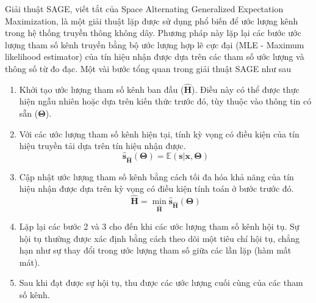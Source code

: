 Giải thuật SAGE, viết tắt của Space Alternating Generalized Expectation Maximization, là một giải thuật lặp được sử dụng phổ biến để ước lượng kênh trong hệ thống truyền thông không dây. Phương pháp này lặp lại các bước ước lượng tham số kênh truyền bằng bộ ước lượng hợp lẽ cực đại (MLE - Maximum likelihood estimator) của tín hiệu nhận được dựa trên các tham số ước lượng và thông số từ đo đạc. Một vài bước tổng quan trong giải thuật SAGE như sau
\begin{enumerate}
    \item Khởi tạo ước lượng tham số kênh ban đầu ($\hat{\mathbf{H}}$). Điều này có thể được thực hiện ngẫu nhiên hoặc dựa trên kiến thức trước đó, tùy thuộc vào thông tin có sẵn ($\boldsymbol{\Theta}$).
    \item Với các ước lượng tham số kênh hiện tại, tính kỳ vọng có điều kiện của tín hiệu truyền tải dựa trên tín hiệu nhận được.
    \begin{equation*}
        \hat{\mathbf{s}}_{\hat{\mathbf{H}}} (\boldsymbol{\Theta}) = \mathbb{E} (\mathbf{s} | \mathbf{x}, \boldsymbol\Theta)
    \end{equation*}
    \item Cập nhật ước lượng tham số kênh bằng cách tối đa hóa khả năng của tín hiệu nhận được dựa trên kỳ vọng có điều kiện tính toán ở bước trước đó.
    \begin{equation*}
        \hat{\mathbf{H}} = \min_{\hat{\mathbf{H}}} \hat{\mathbf{s}}_{\hat{\mathbf{H}}} (\boldsymbol{\Theta})
    \end{equation*}
    \item Lặp lại các bước 2 và 3 cho đến khi các ước lượng tham số kênh hội tụ. Sự hội tụ thường được xác định bằng cách theo dõi một tiêu chí hội tụ, chẳng hạn như sự thay đổi trong ước lượng tham số giữa các lần lặp (hàm mất mát).
    \item Sau khi đạt được sự hội tụ, thu được các ước lượng cuối cùng của các tham số kênh.
\end{enumerate}

